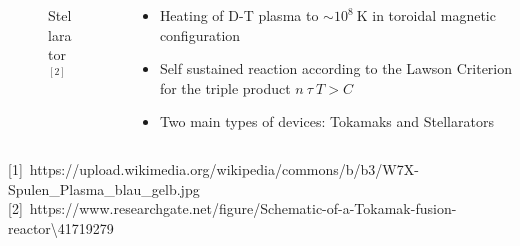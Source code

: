\documentclass{beamer}
\begin{document}
\begin{frame}
\begin{columns}[onlytextwidth]
\begin{column}{0.45\textwidth}
\begin{center}
\begin{figure}
	\vspace{-0.4cm}	\caption{Stellarator$^{[2]}$}
		\end{figure}
		\end{center}
	\end{column}
	\begin{column}{0.45\textwidth}
		\vspace{0 cm}
		\begin{center}
			\begin{itemize}
				\item Heating of D-T plasma to $\sim10^8~\text{K}$ in toroidal magnetic configuration
				\item Self sustained reaction according to the Lawson Criterion for the triple product $n~\tau~T > C$
				\item Two main types of devices: Tokamaks and Stellarators
			\end{itemize}
		\end{center}
	\end{column}
\end{columns}
	\begin{footnotesize}
	{\tiny [1]~https://upload.wikimedia.org/wikipedia/commons/b/b3/W7X-Spulen\_Plasma\_blau\_gelb.jpg\hfill
\vspace{-0.2cm} [2]~https://www.researchgate.net/figure/Schematic-of-a-Tokamak-fusion-reactor\textbackslash41719279}
\end{footnotesize}
 \end{frame}
\end{document}
